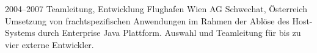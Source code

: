 \cventry
{2004--2007}
{Teamleitung, Entwicklung}
{}
{Flughafen Wien AG}
{Schwechat, Österreich}
{
  Umsetzung von frachtspezifischen Anwendungen im Rahmen der Ablöse des
  Host-Systems durch Enterprise Java Plattform. Auswahl und Teamleitung für bis zu vier externe Entwickler.
}
